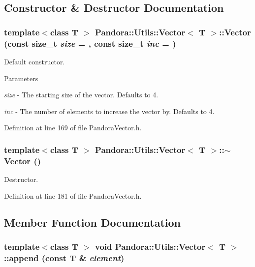 \subsection{Constructor \& Destructor Documentation}
\hypertarget{classPandora_1_1Utils_1_1Vector_a08c4f102c57e56cabbca1c15e8c17122}{
\subsubsection[{Vector}]{\setlength{\rightskip}{0pt plus 5cm}template$<$class T $>$ {\bf Pandora::Utils::Vector}$<$ T $>$::{\bf Vector} (const size\_\-t {\em size} = {}, \/  const size\_\-t {\em inc} = {})}}
\label{classPandora_1_1Utils_1_1Vector_a08c4f102c57e56cabbca1c15e8c17122}


Default constructor. 
\begin{DoxyParams}{Parameters}
\item[{\em size}]-\/ The starting size of the vector. Defaults to 4. \item[{\em inc}]-\/ The number of elements to increase the vector by. Defaults to 4. \end{DoxyParams}


Definition at line 169 of file PandoraVector.h.\hypertarget{classPandora_1_1Utils_1_1Vector_ab2688a6e46b857ad4756d21adadb0a20}{
\subsubsection[{$\sim$Vector}]{\setlength{\rightskip}{0pt plus 5cm}template$<$class T $>$ {\bf Pandora::Utils::Vector}$<$ T $>$::$\sim${\bf Vector} ()}}
\label{classPandora_1_1Utils_1_1Vector_ab2688a6e46b857ad4756d21adadb0a20}


Destructor. 

Definition at line 181 of file PandoraVector.h.

\subsection{Member Function Documentation}
\hypertarget{classPandora_1_1Utils_1_1Vector_a6c1c963c1d58b1e371a07c048c33cdca}{
\subsubsection[{append}]{\setlength{\rightskip}{0pt plus 5cm}template$<$class T $>$ void {\bf Pandora::Utils::Vector}$<$ T $>$::append (const T \& {\em element})}}
\label{classPandora_1_1Utils_1_1Vector_a6c1c963c1d58b1e371a07c048c33cdca}


